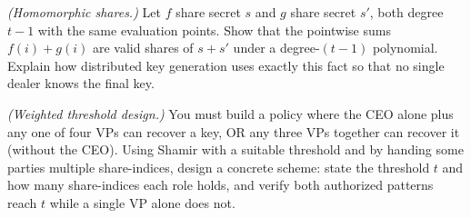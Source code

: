 \begin{exercise}
\emph{(Homomorphic shares.)} Let $f$ share secret $s$ and $g$ share secret $s'$, both degree $t-1$ with the same evaluation points. Show that the pointwise sums $f(i)+g(i)$ are valid shares of $s + s'$ under a degree-$(t-1)$ polynomial. Explain how distributed key generation uses exactly this fact so that no single dealer knows the final key.
\end{exercise}

\begin{exercise}
\emph{(Weighted threshold design.)} You must build a policy where the CEO alone plus any one of four VPs can recover a key, OR any three VPs together can recover it (without the CEO). Using Shamir with a suitable threshold and by handing some parties multiple share-indices, design a concrete scheme: state the threshold $t$ and how many share-indices each role holds, and verify both authorized patterns reach $t$ while a single VP alone does not.
\end{exercise}
